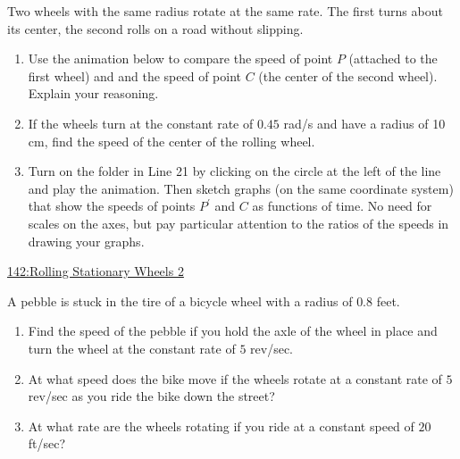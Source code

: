 \documentclass{ximera}
\begin{document}
\begin{exploration}\label{exp:angles2}
Two wheels with the same radius rotate at the same rate. The first turns about its center, the second rolls on a road without slipping.

\begin{enumerate}
\item Use the animation below to compare the speed of point $P$ (attached to the first wheel) and and the speed of point $C$ (the center of the second wheel). Explain your reasoning. %

\item If the wheels turn at the constant rate of $0.45$ rad/s and have a radius of 10 cm, find the speed of the center of the rolling wheel. %

\item Turn on the folder in Line 21 by clicking on the circle at the left of the line and play the animation. Then sketch graphs (on the same coordinate system) that show the speeds of points $P^\prime$ and $C$ as functions of time. No need for scales on the axes, but pay particular attention to the ratios of the speeds in drawing  your graphs.

\end{enumerate}

 
\begin{onlineOnly}
    \begin{center}
\end{center}
\end{onlineOnly}
\end{exploration}

\href{https://www.desmos.com/calculator/jkcjrnavxp}{142:Rolling Stationary Wheels 2}

\begin{question} \label{Qdsfdsf4rt5yy55t}
A pebble is stuck in the tire of a bicycle wheel with a radius of $0.8$ feet. 
\begin{enumerate}
\item Find the speed of the pebble if you hold the axle of the wheel in place and turn the wheel at the constant rate of $5$ rev/sec.

\item At what speed does the bike move if the wheels rotate at a constant rate of $5$ rev/sec as you ride the bike down the street?

\item At what rate are the wheels rotating if you ride at a constant speed of $20$ ft/sec?

\end{enumerate}

\end{question}
\end{document}
